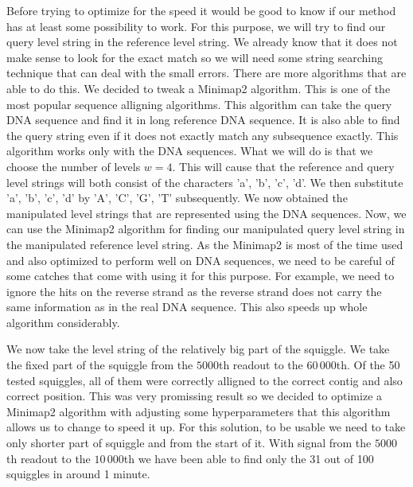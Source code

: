 Before trying to optimize for the speed it would be good to know if our method
has at least some possibility to work. For this purpose, we will try to
find our query level string in the reference level string. We already know that
it does not make sense to look for the exact match so we will need some string searching
technique that can deal with the small errors. There are more algorithms that are able
to do this. We decided to tweak a Minimap2 \cite{li2018minimap2} algorithm. This is
one of the most popular sequence alligning algorithms. This algorithm can take the
query DNA sequence and find it in long reference DNA sequence. It is also able to
find the query string even if it does not exactly match any subsequence exactly.
This algorithm works only with the DNA sequences. What we will do is that we choose
the number of levels $w=4$. This will cause that the reference and query level strings will both consist of
the characters 'a', 'b', 'c', 'd'. We then substitute 'a', 'b', 'c', 'd' by
'A', 'C', 'G', 'T' subsequently. We now obtained the manipulated level strings that
are represented using the DNA sequences. Now, we can use the Minimap2 algorithm for
finding our manipulated query level string in the manipulated reference level string.
As the Minimap2 is most of the time used and also optimized to perform well on DNA
sequences, we need to be careful of some catches that come with using it for this
purpose. For example, we need to ignore the hits on the reverse strand as the
reverse strand does not carry the same information as in the real DNA sequence.
This also speeds up whole algorithm considerably.

We now take the level string of the relatively big part of the squiggle. We take the
fixed part of the squiggle from the $5000$th readout to the $60\,000$th. Of the 50
tested squiggles, all of them were correctly alligned to the correct contig and also
correct position. This was very promissing result so we decided to optimize a
Minimap2 algorithm with adjusting some hyperparameters that this algorithm allows us
to change to speed it up. For this solution, to be usable we need to take only
shorter part of squiggle and from the start of it. With signal from the $5000$th
readout to the $10\,000$th we have been able to find only the 31 out of 100 squiggles
in around 1 minute.
